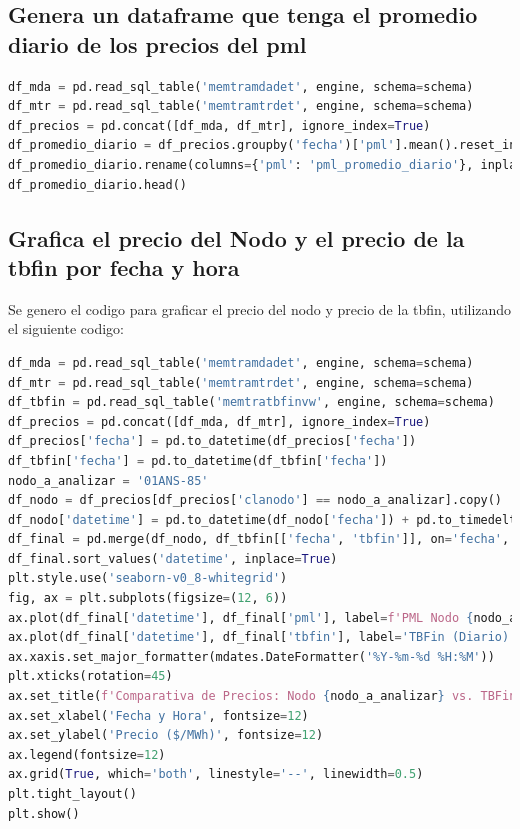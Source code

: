 \documentclass[11pt, a4paper]{article}
\begin{document}
\subsection{Genera un dataframe que tenga el promedio diario de los precios del pml}

\begin{lstlisting}[language=Python]
df_mda = pd.read_sql_table('memtramdadet', engine, schema=schema)
df_mtr = pd.read_sql_table('memtramtrdet', engine, schema=schema)
df_precios = pd.concat([df_mda, df_mtr], ignore_index=True)
df_promedio_diario = df_precios.groupby('fecha')['pml'].mean().reset_index()
df_promedio_diario.rename(columns={'pml': 'pml_promedio_diario'}, inplace=True)
df_promedio_diario.head()
\end{lstlisting}

\newpage
\subsection{Grafica el precio del Nodo y el precio de la tbfin por fecha y hora}

Se genero el codigo para graficar el precio del nodo y precio de la tbfin, utilizando el siguiente codigo:

\begin{lstlisting}[language=Python]
df_mda = pd.read_sql_table('memtramdadet', engine, schema=schema)
df_mtr = pd.read_sql_table('memtramtrdet', engine, schema=schema)
df_tbfin = pd.read_sql_table('memtratbfinvw', engine, schema=schema)
df_precios = pd.concat([df_mda, df_mtr], ignore_index=True)
df_precios['fecha'] = pd.to_datetime(df_precios['fecha'])
df_tbfin['fecha'] = pd.to_datetime(df_tbfin['fecha'])
nodo_a_analizar = '01ANS-85'
df_nodo = df_precios[df_precios['clanodo'] == nodo_a_analizar].copy()
df_nodo['datetime'] = pd.to_datetime(df_nodo['fecha']) + pd.to_timedelta(df_nodo['hora'], unit='h')
df_final = pd.merge(df_nodo, df_tbfin[['fecha', 'tbfin']], on='fecha', how='left')
df_final.sort_values('datetime', inplace=True)
plt.style.use('seaborn-v0_8-whitegrid')
fig, ax = plt.subplots(figsize=(12, 6))
ax.plot(df_final['datetime'], df_final['pml'], label=f'PML Nodo {nodo_a_analizar}', color='royalblue', zorder=2)
ax.plot(df_final['datetime'], df_final['tbfin'], label='TBFin (Diario)', color='darkorange', linestyle='--', linewidth=2, zorder=3)
ax.xaxis.set_major_formatter(mdates.DateFormatter('%Y-%m-%d %H:%M'))
plt.xticks(rotation=45)
ax.set_title(f'Comparativa de Precios: Nodo {nodo_a_analizar} vs. TBFin', fontsize=16)
ax.set_xlabel('Fecha y Hora', fontsize=12)
ax.set_ylabel('Precio ($/MWh)', fontsize=12)
ax.legend(fontsize=12)
ax.grid(True, which='both', linestyle='--', linewidth=0.5)
plt.tight_layout()
plt.show()
\end{lstlisting}
\end{document}
